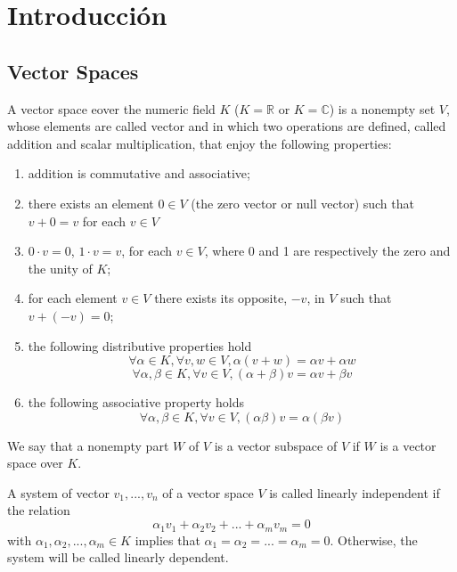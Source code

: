 \chapter{Introducción}
\section{Vector Spaces}
\begin{definition}
    A vector space eover the numeric field $K$ ($K = \mathbb{R}$ or $K = \mathbb{C}$) is a nonempty set $V$, whose elements are called vector and in which two operations are defined, called addition and scalar multiplication, that enjoy the following properties:
    \begin{enumerate}
        \item addition is commutative and associative;
        \item there exists an element $0 \in V$ (the zero vector or null vector) such that $v + 0 = v$ for each $v \in V$
        \item $0 \cdot v = 0$, $1 \cdot v = v$, for each $v \in V$, where 0 and 1 are respectively the zero and the unity of $K$;
        \item for each element $v \in V$ there exists its opposite, $-v$, in $V$ such that $v + (-v) = 0$;
        \item the following distributive properties hold
        \[\forall \alpha \in K, \forall v,w \in V, \alpha(v + w) = \alpha v + \alpha w\]
        \[\forall \alpha , \beta \in K, \forall v \in V, (\alpha + \beta)v = \alpha v + \beta v\]
        \item the following associative property holds
        \[\forall \alpha , \beta \in K, \forall v \in V, (\alpha \beta)v = \alpha (\beta v)\]
    \end{enumerate}
\end{definition}

\begin{definition}
    We say that a nonempty part $W$ of $V$ is a vector subspace of $V$ if $W$ is a vector space over $K$.
\end{definition}

\begin{definition}
    A system of vector ${v_1, ..., v_n}$ of a vector space $V$ is called linearly independent if the relation
    \[\alpha_1 v_1 + \alpha_2 v_2 +...+ \alpha_m v_m = 0\]
    with $\alpha_1, \alpha_2, ..., \alpha_m \in K$ implies that $\alpha_1 = \alpha_2 = ...= \alpha_m = 0$. Otherwise, the system will be called linearly dependent.
\end{definition}

